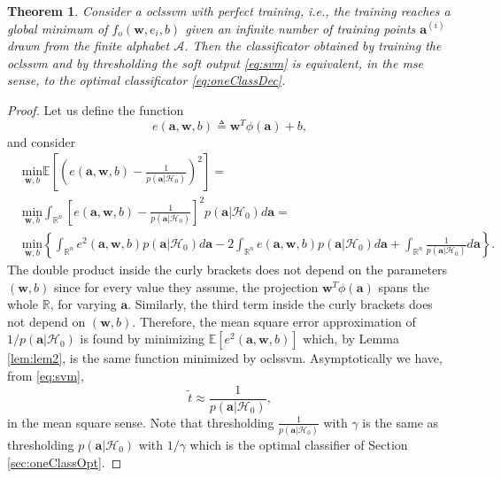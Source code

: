 \documentclass[draftcls,onecolumn,12pt]{IEEEtran}
\newcommand{\ie}{i.e., }
\newcommand{\Exp}[1]{\mathbb{E}\left[#1\right]}
\newtheorem{theorem}{Theorem}
\begin{document}
\begin{theorem}
	\label{th:onelsnp}
	Consider a \ac{oclssvm} with perfect training, \ie the training reaches a global minimum of $f_o(\mathbf{w},e_i,b)$ given an infinite number of training points $\bm{a}^{(i)}$ drawn from the finite alphabet $\mathcal A$. Then the classificator obtained by training the \ac{oclssvm} and by thresholding the soft output \eqref{eq:svm} is equivalent, in the \ac{mse} sense, to the optimal classificator \eqref{eq:oneClassDec}.
\end{theorem}

\begin{proof}
Let us define the function 
\begin{equation}
	e(\mathbf{a},\mathbf{w},b) \triangleq \mathbf{w}^T \phi (\mathbf{a}) + b,	
\end{equation}
and consider 
\begin{equation}
	\begin{aligned}
		&\underset{\mathbf{w},b}{\text{min}} \Exp{ \left( e(\mathbf{a},\mathbf{w},b) - \frac{1}{p(\mathbf{a}|\mathcal{H}_0)}\right) ^2} = \\
		&\underset{\mathbf{w},b}{\text{min}} \int_{\mathbb{R}^n} \left[ e(\mathbf{a},\mathbf{w},b) - \frac{1}{p(\mathbf{a}|\mathcal{H}_0)} \right] ^2 p(\mathbf{a}|\mathcal{H}_0) d\mathbf{a} = \\
		&\underset{\mathbf{w},b}{\text{min}} \left\lbrace \int_{\mathbb{R}^n} e^2(\mathbf{a},\mathbf{w},b) p(\mathbf{a}|\mathcal{H}_0) d\mathbf{a}
		-2\int_{\mathbb{R}^n} e(\mathbf{a},\mathbf{w},b) p(\mathbf{a}|\mathcal{H}_0) d\mathbf{a}
		+ \int_{\mathbb{R}^n} \frac{1}{p(\mathbf{a}|\mathcal{H}_0)} d\mathbf{a} \right\rbrace.
	\end{aligned}	
\end{equation}
The double product inside the curly brackets does not depend on the parameters $(\mathbf{w},b)$ since for every value they assume, the projection $\mathbf{w}^T \phi (\mathbf{a})$ spans the whole $\mathbb{R}$, for varying $\mathbf{a}$. Similarly, the third term inside the curly brackets does not depend on $(\mathbf{w},b)$. Therefore, the mean square error approximation of $1/p(\mathbf{a}|\mathcal{H}_0)$ is found by minimizing $\Exp{e^2(\mathbf{a},\mathbf{w},b)}$ which, by Lemma \ref{lem:lem2}, is the same function minimized by \ac{oclssvm}. Asymptotically we have, from \eqref{eq:svm},
\begin{equation}
\label{eq:approx}
	\tilde{t} \approx \frac{1}{p(\mathbf{a}|\mathcal{H}_0)},	
\end{equation} 
in the mean square sense. Note that thresholding $\frac{1}{p(\mathbf{a}|\mathcal{H}_0)}$ with $\gamma$ is the same as thresholding $p(\mathbf{a}|\mathcal{H}_0)$ with $1/\gamma$ which is the optimal classifier of Section \ref{sec:oneClassOpt}.
\end{proof}
\end{document}
